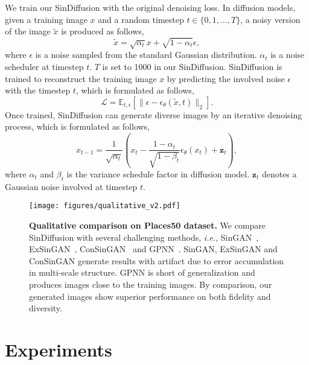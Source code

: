 \documentclass[10pt,twocolumn,letterpaper]{article}
\begin{document}
We train our SinDiffusion with the original denoising loss.
In diffusion models, given a training image $x$ and a random timestep $t \in \{0, 1, \dots, T\}$, a noisy version of the image $\widetilde{x}$ is produced as follows,
\begin{equation}
    \widetilde{x} = \sqrt{\alpha_t} x + \sqrt{1 - \alpha_t} \epsilon,
\end{equation}
where $\epsilon$ is a noise sampled from the standard Gaussian distribution.
$\alpha_t$ is a noise scheduler at timestep $t$.
$T$ is set to 1000 in our SinDiffusion.
SinDiffusion is trained to reconstruct the training image $x$ by predicting the involved noise $\epsilon$ with the timestep $t$, which is formulated as follows,
\begin{equation}
    \mathcal{L} = \mathbb{E}_{t, \epsilon}[\|\epsilon - \epsilon_\theta(\widetilde{x}, t)\|_2].
\end{equation}
Once trained, SinDiffusion can generate diverse images by an iterative denoising process, which is formulated as follows,
\begin{equation}
    x_{t-1} = \frac{1}{\sqrt{\alpha_t}}(x_t - \frac{1 - \alpha_t}{\sqrt{1-\beta_t}}\epsilon_\theta(x_t) + \mathbf{z}_t),
\end{equation}
where $\alpha_t$ and $\beta_t$ is the variance schedule factor in diffusion model.
$\mathbf{z}_t$ denotes a Gaussian noise involved at timestep $t$.

\begin{figure*}[t]
  \centering
   \texttt{[image: figures/qualitative\_v2.pdf]}
   \vspace{-7mm}
   \caption{
   \textbf{Qualitative comparison on Places50 dataset.}
   We compare SinDiffusion with several challenging methods, \emph{i.e.}, SinGAN~\cite{shaham2019singan}, ExSinGAN~\cite{zhang2021exsingan}, ConSinGAN~\cite{hinz2021improved} and GPNN~\cite{granot2022drop}.
   SinGAN, ExSinGAN and ConSinGAN generate results with artifact due to error accumulation in multi-scale structure.
   GPNN is short of generalization and produces images close to the training images.
   By comparison, our generated images show superior performance on both fidelity and diversity.
   }
   \vspace{-6mm}
   \label{fig:qualitative}
\end{figure*}

\section{Experiments}
\label{sec:formatting}
\end{document}
